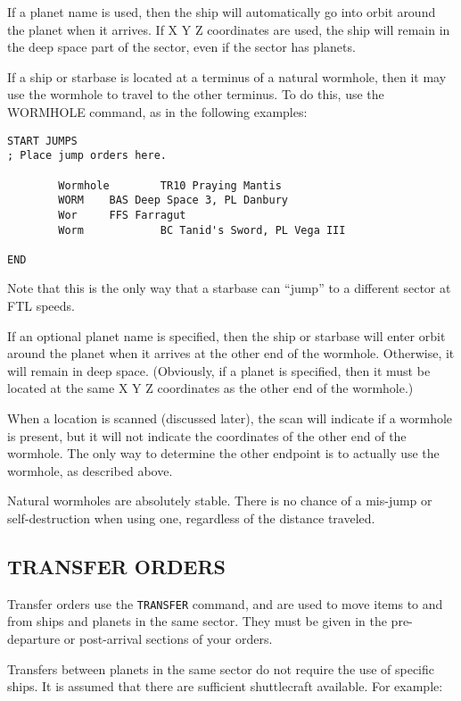 \documentclass[10pt,titlepage]{article}
\begin{document}
If a planet name is used, then the ship will automatically go into orbit around
the planet when it arrives.  If X Y Z coordinates are used, the ship will
remain in the deep space part of the sector, even if the sector has planets.

If a ship or starbase is located at a terminus of a natural wormhole, then it
may use the wormhole to travel to the other terminus.  To do this, use the
WORMHOLE command, as in the following examples:

\begin{verbatim}
START JUMPS
; Place jump orders here.

        Wormhole        TR10 Praying Mantis
        WORM    BAS Deep Space 3, PL Danbury
        Wor     FFS Farragut
        Worm            BC Tanid's Sword, PL Vega III

END
\end{verbatim} 

Note that this is the only way that a starbase can ``jump'' to a different
sector at FTL speeds.

If an optional planet name is specified, then the ship or starbase will enter
orbit around the planet when it arrives at the other end of the wormhole.
Otherwise, it will remain in deep space.  (Obviously, if a planet is specified,
then it must be located at the same X Y Z coordinates as the other end of the
wormhole.)

When a location is scanned (discussed later), the scan will indicate if a
wormhole is present, but it will not indicate the coordinates of the other end
of the wormhole.  The only way to determine the other endpoint is to actually
use the wormhole, as described above.

Natural wormholes are absolutely stable.  There is no chance of a mis-jump or
self-destruction when using one, regardless of the distance traveled.


\subsection{TRANSFER ORDERS}
\label{sec:transferorders}


Transfer orders use the \texttt{TRANSFER} command, and are used to move items to and
from ships and planets in the same sector.  They must be given in the pre-
departure or post-arrival sections of your orders.

Transfers between planets in the same sector do not require the use of specific
ships.  It is assumed that there are sufficient shuttlecraft available.  For
example:
\end{document}
